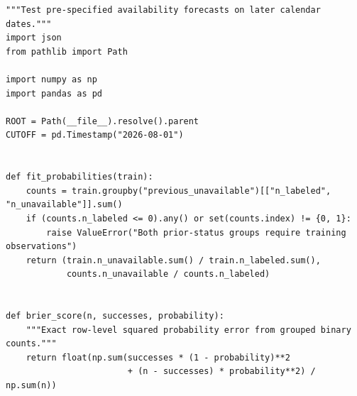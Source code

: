 \begin{Verbatim}[breaklines,breakanywhere,fontsize=\small]
"""Test pre-specified availability forecasts on later calendar dates."""
import json
from pathlib import Path

import numpy as np
import pandas as pd

ROOT = Path(__file__).resolve().parent
CUTOFF = pd.Timestamp("2026-08-01")


def fit_probabilities(train):
    counts = train.groupby("previous_unavailable")[["n_labeled", "n_unavailable"]].sum()
    if (counts.n_labeled <= 0).any() or set(counts.index) != {0, 1}:
        raise ValueError("Both prior-status groups require training observations")
    return (train.n_unavailable.sum() / train.n_labeled.sum(),
            counts.n_unavailable / counts.n_labeled)


def brier_score(n, successes, probability):
    """Exact row-level squared probability error from grouped binary counts."""
    return float(np.sum(successes * (1 - probability)**2
                        + (n - successes) * probability**2) / np.sum(n))



\end{Verbatim}
